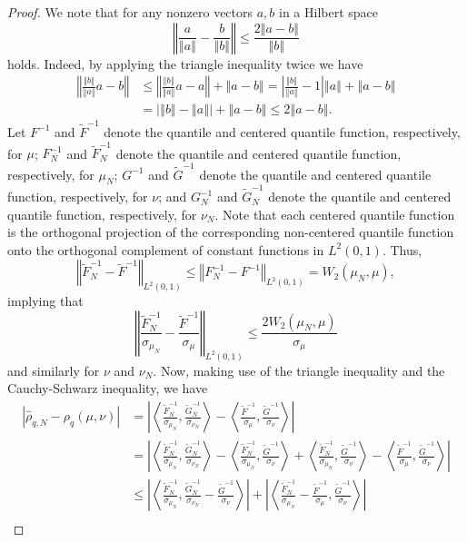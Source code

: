 \documentclass{amsart}
\numberwithin{equation}{section}
\theoremstyle{plain}
\theoremstyle{definition}
\newcommand{\ip}[2]{\left<#1,#2\right>}
\newcommand{\norm}[1]{\left\Vert#1\right\Vert}
\newcommand{\abs}[1]{\left\vert#1\right\vert}
\begin{document}
\begin{proof}
We note that for any nonzero vectors $a, b$ in a Hilbert space
\[
\norm{\frac{a}{\norm{a}}-\frac{b}{\norm{b}}} \leq \frac{2\norm{a-b}}{\norm{b}}
\]
holds.
Indeed, by applying the triangle inequality twice we have
\begin{align*}  
\norm{\frac{\norm{b}}{\norm{a}}a-b} &\leq \norm{\frac{\norm{b}}{\norm{a}}a-a} + \norm{a-b}= \abs{\frac{\norm{b}}{\norm{a}}-1} \norm{a} + \norm{a-b}\\
&= \abs{\norm{b}-\norm{a}} +  \norm{a-b}\leq 2 \norm{a-b}.
\end{align*}
Let $F^{-1}$ and $\tilde{F}^{-1}$ denote the quantile and centered quantile function, respectively, for $\mu$; $F_N^{-1}$ and $\tilde{F}_N^{-1}$ denote the quantile and centered quantile function, respectively, for $\mu_N$; $G^{-1}$ and $\tilde{G}^{-1}$ denote the quantile and centered quantile function, respectively, for $\nu$; and  $G_N^{-1}$ and $\tilde{G}_N^{-1}$ denote the quantile and centered quantile function, respectively, for $\nu_N$.
Note that each centered quantile function is the orthogonal projection of the corresponding non-centered quantile function onto the orthogonal complement of constant functions in $L^2(0,1)$.
Thus,
\[
\norm{\tilde{F}_N^{-1} - \tilde{F}^{-1}}_{L^2(0,1)} \leq  \norm{F_N^{-1} - F^{-1}}_{L^2(0,1)} = W_2(\mu_N, \mu),
\]
implying that
\[
\norm{\frac{\tilde{F}_N^{-1}}{\sigma_{\mu_N}} - \frac{\tilde{F}^{-1}}{\sigma_{\mu}}}_{L^2(0,1)} \leq \frac{2W_2(\mu_N,\mu)}{\sigma_\mu}
\]
and similarly for $\nu$ and $\nu_N$.
Now, making use of the triangle inequality and the Cauchy-Schwarz inequality, we have
\begin{align*}
    \abs{\hat{\rho}_{q,N} - \rho_q(\mu,\nu)} &= \abs{\ip{\frac{\tilde{F}_N^{-1}}{\sigma_{\mu_N}}}{\frac{\tilde{G}_N^{-1}}{\sigma_{\nu_N}}} - \ip{\frac{\tilde{F}^{-1}}{\sigma_{\mu}}}{\frac{\tilde{G}^{-1}}{\sigma_{\nu}}}}\\
    &= \abs{\ip{\frac{\tilde{F}_N^{-1}}{\sigma_{\mu_N}}}{\frac{\tilde{G}_N^{-1}}{\sigma_{\nu_N}}} - \ip{\frac{\tilde{F}_N^{-1}}{\sigma_{\mu_N}}}{\frac{\tilde{G}^{-1}}{\sigma_{\nu}}} + \ip{\frac{\tilde{F}_N^{-1}}{\sigma_{\mu_N}}}{\frac{\tilde{G}^{-1}}{\sigma_{\nu}}}- \ip{\frac{\tilde{F}^{-1}}{\sigma_{\mu}}}{\frac{\tilde{G}^{-1}}{\sigma_{\nu}}}}\\ 
    &\leq \abs{\ip{\frac{\tilde{F}_N^{-1}}{\sigma_{\mu_N}}}{\frac{\tilde{G}_N^{-1}}{\sigma_{\nu_N}}-\frac{\tilde{G}^{-1}}{\sigma_{\nu}}}} + \abs{\ip{\frac{\tilde{F}_N^{-1}}{\sigma_{\mu_N}}-\frac{\tilde{F}^{-1}}{\sigma_{\mu}}}{\frac{\tilde{G}^{-1}}{\sigma_{\nu}}}}\\

\end{align*}
\end{proof}
\end{document}
